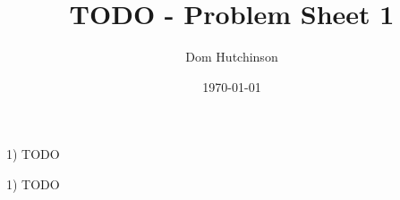 \documentclass[11pt,a4paper]{article}
\begin{document}

\title{TODO - Problem Sheet 1}
\author{Dom Hutchinson}
\date{\today}
\maketitle


\begin{question}{1)}
  TODO
\end{question}

\begin{answer}{1)}
  TODO
\end{answer}
\end{document}
